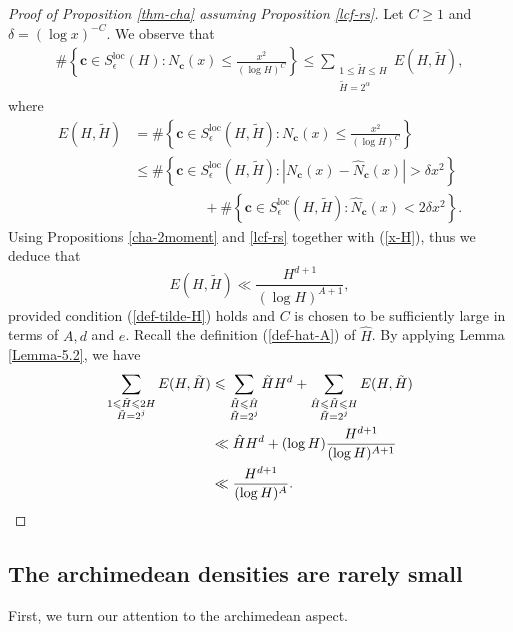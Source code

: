 \documentclass[reqno, 11pt]{amsart}
\renewcommand{\leq}{\leqslant}
\renewcommand{\geq}{\geqslant}
\theoremstyle{definition}
\theoremstyle{definition}
\renewcommand{\geq}{\geqslant}
\renewcommand{\leq}{\leqslant}
\newcommand{\cc}{\mathbf{c}}
\numberwithin{equation}{section}
\begin{document}
\begin{proof}[Proof of Proposition \ref{thm-cha} assuming Proposition \ref{lcf-rs}]
Let $C \geq 1$ and $\delta = (\log x)^{-C}$. We observe that
  \begin{align*}
  	\#\left\{\cc \in S_\epsilon^{\mathrm{loc}}(H): N_\cc(x) \leq \frac{x^2}{(\log H)^{C}} \right\} \leq \sum_{\substack{1 \leq \tilde{H} \leq H \\ \tilde{H} = 2^\alpha}} E(H, \tilde{H}),
  \end{align*}
where
  \begin{align*}
  	E(H, \tilde{H}) & = \#\left\{\cc \in S_\epsilon^{\mathrm{loc}}(H, \tilde{H}): N_\cc(x) \leq \frac{x^2}{(\log H)^{C}} \right\} \\
  	& \leq \#\left\{\cc \in S_\epsilon^{\mathrm{loc}}(H, \tilde{H}): |N_\cc(x) - \hat{N}_\cc(x)| > \delta x^2 \right\}  \\
  	& \quad \quad \quad \quad \quad  + \#\left\{\cc \in S_\epsilon^{\mathrm{loc}}(H, \tilde{H}): \hat{N}_\cc(x) < 2 \delta x^2 \right\}.
  \end{align*}
  Using Propositions \ref{cha-2moment} and \ref{lcf-rs} together with (\ref{x-H}), thus we deduce that
  $$E(H, \tilde{H}) \ll \frac{H^{d+1}}{(\log H)^{A+1}},$$ 
  provided condition (\ref{def-tilde-H}) holds and $C$ is chosen to be sufficiently large in terms of $A, d$ and $e$. Recall the definition (\ref{def-hat-A}) of $\hat{H}$. By applying Lemma \ref{Lemma-5.2}, we have
	\begin{align*}
		\sum_{\substack{1 \leq \tilde{H} \leq 2H \\ \tilde{H} = 2^j}} E(H, \tilde{H}) & \leq \sum_{\substack{\tilde{H} \leq \hat{H} \\ \tilde{H} = 2^j}} \tilde{H} H^d + \sum_{\substack{\hat{H} \leq \tilde{H} \leq H \\ \tilde{H} = 2^j}} E(H, \tilde{H}) \\
		& \ll \hat{H} H^d + (\log H) \frac{H^{d+1}}{(\log H)^{A+1}} \\
		& \ll \frac{H^{d+1}}{(\log H)^A}.\qedhere
	\end{align*}
\end{proof}



\subsection{The archimedean densities are rarely small}
First, we turn our attention to the archimedean aspect. 
\end{document}
